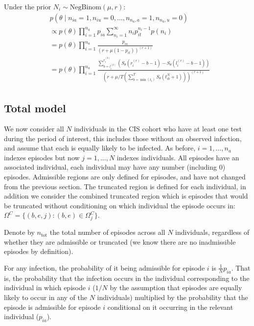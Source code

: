\documentclass[main.tex]{subfiles}
\begin{document}
Under the prior $N_i \sim \text{NegBinom}(\mu, r)$:
\begin{align}
&p(\theta \mid n_{ia} = 1, n_{iu} = 0, \dots, n_{n_a,a} = 1, n_{n_a,u} = 0) \\
&\propto p(\theta) \prod_{i=1}^{n_a} p_{ia} \sum_{n_i=1}^\infty n_i p_{it}^{n_i- 1} p(n_i) \\
&= p(\theta) \prod_{i=1}^{n_a} \frac{p_{ia}}{(r+\mu (1-p_{it}))^{(r+1)}} \\
&= p(\theta) \prod_{i=1}^{n_a} \frac{\sum_{b=l_i^{(b)}}^{r_i^{(b)}} \left( S_\theta(r_i^{(e)} - b - 1) - S_\theta(l_i^{(e)} - b - 1) \right)}{\left( r+\mu/T \left( \sum_{b=\min(t_i)}^T S_\theta(t_{ib}^N + 1) \right) \right)^{(r+1)}} \\
\end{align}

\subsection{Total model}\label{perf-test:sec:total-model}

We now consider all $N$ individuals in the CIS cohort who have at
least one test during the period of interest, this includes those
without an observed infection, and assume that each is equally likely to
be infected. As before, $i = 1, \dots, n_a$ indexes episodes but now
$j = 1, \dots, N$ indexes individuals. All episodes have an associated
individual, each individual may have any number (including 0) episodes.
Admissible regions are only defined for episodes, and have not changed
from the previous section. The truncated region is defined for each
individual, in addition we consider the combined truncated region which
is episodes that would be truncated without conditioning on which
individual the episode occurs in:
$\Omega^C = \{ (b, e, j) : (b, e) \in \Omega_j^C \}$.

Denote by $n_\text{tot}$ the total number of episodes across all $N$
individuals, regardless of whether they are admissible or truncated (we
know there are no inadmissible episodes by definition).

For any infection, the probability of it being admissible for episode
$i$ is $\frac{1}{N} p_{ia}$. That is, the probability that the
infection occurs in the individual corresponding to the individual in
which episode $i$ ($1/N$ by the assumption that episodes are equally
likely to occur in any of the $N$ individuals) multiplied by the
probability that the episode is admissible for episode $i$ conditional
on it occurring in the relevant individual ($p_{ia}$).
\end{document}
